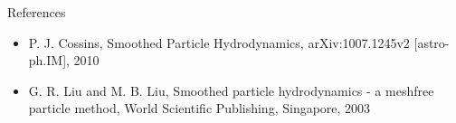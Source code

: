 \documentclass{beamer}
\begin{document}
\begin{frame}{References}
\begin{itemize}

\item P. J. Cossins, Smoothed Particle Hydrodynamics, arXiv:1007.1245v2 [astro-ph.IM], 2010 

\item G. R. Liu and M. B. Liu, Smoothed particle hydrodynamics - a meshfree particle method, World Scientific Publishing, Singapore, 2003

\end{itemize}
\end{frame}
\end{document}
